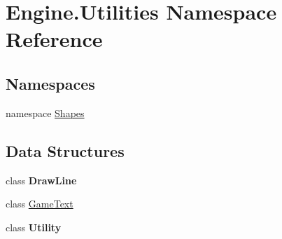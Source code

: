 \hypertarget{a00281}{}\section{Engine.\+Utilities Namespace Reference}
\label{a00281}
\subsection*{Namespaces}
\begin{DoxyCompactItemize}
\item 
namespace \hyperlink{a00283}{Shapes}
\end{DoxyCompactItemize}
\subsection*{Data Structures}
\begin{DoxyCompactItemize}
\item 
class {\bfseries Draw\+Line}
\item 
class \hyperlink{a00598}{Game\+Text}
\item 
class {\bfseries Utility}
\end{DoxyCompactItemize}
